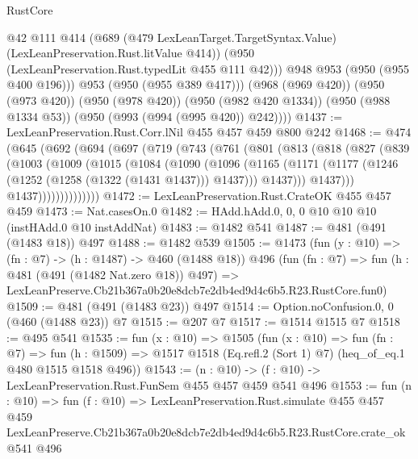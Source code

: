 \begin{lexlean}{RustCore}
\begin{coremodule}
              @42
              @111
              @414
              (@689
                (@479 LexLeanTarget.TargetSyntax.Value)
                (LexLeanPreservation.Rust.litValue @414))
              (@950 (LexLeanPreservation.Rust.typedLit @455 @111 @42)))
            @948
            @953
            (@950 (@955 @400 @196)))
          @953
          (@950 (@955 @389 @417)))
        (@968 (@969 @420))
        (@950 (@973 @420))
        (@950 (@978 @420))
        (@950 (@982 @420 @1334))
        (@950 (@988 @1334 @53))
        (@950 (@993 (@994 (@995 @420)) @242))))
@1437 := LexLeanPreservation.Rust.Corr.lNil @455 @457 @459 @800 @242
@1468 := @474
    (@645
      (@692
        (@694
          (@697
            (@719
              (@743
                (@761
                  (@801
                    (@813
                      (@818
                        (@827
                          (@839
                            (@1003
                              (@1009
                                (@1015
                                  (@1084
                                    (@1090
                                      (@1096
                                        (@1165
                                          (@1171
                                            (@1177
                                              (@1246 (@1252 (@1258 (@1322 (@1431 @1437))) @1437)))
                                            @1437)))
                                      @1437)))
                                @1437))))))))))))))
@1472 := LexLeanPreservation.Rust.CrateOK @455 @457 @459
@1473 := Nat.casesOn.{0}
@1482 := HAdd.hAdd.{0, 0, 0} @10 @10 @10 (instHAdd.{0} @10 instAddNat)
@1483 := @1482 @541
@1487 := @481 (@491 (@1483 @18)) @497
@1488 := @1482 @539
@1505 := @1473
    (fun (y : @10) => (fn : @7) -> (h : @1487) -> @460 (@1488 @18))
    @496
    (fun (fn : @7) =>
    fun (h : @481 (@491 (@1482 Nat.zero @18)) @497) =>
    LexLeanPreserve.Cb21b367a0b20e8dcb7e2db4ed9d4c6b5.R23.RustCore.fun0)
@1509 := @481 (@491 (@1483 @23)) @497
@1514 := Option.noConfusion.{0, 0} (@460 (@1488 @23)) @7
@1515 := @207 @7
@1517 := @1514 @1515 @7
@1518 := @495 @541
@1535 := fun (x : @10) =>
  @1505
    (fun (x : @10) =>
    fun (fn : @7) =>
    fun (h : @1509) => @1517 @1518 (Eq.refl.{2} (Sort 1) @7) (heq_of_eq.{1} @480 @1515 @1518 @496))
@1543 := (n : @10) -> (f : @10) -> LexLeanPreservation.Rust.FunSem @455 @457 @459 @541 @496
@1553 := fun (n : @10) =>
  fun (f : @10) =>
  LexLeanPreservation.Rust.simulate
    @455
    @457
    @459
    LexLeanPreserve.Cb21b367a0b20e8dcb7e2db4ed9d4c6b5.R23.RustCore.crate_ok
    @541
    @496
\end{coremodule}
\end{lexlean}
